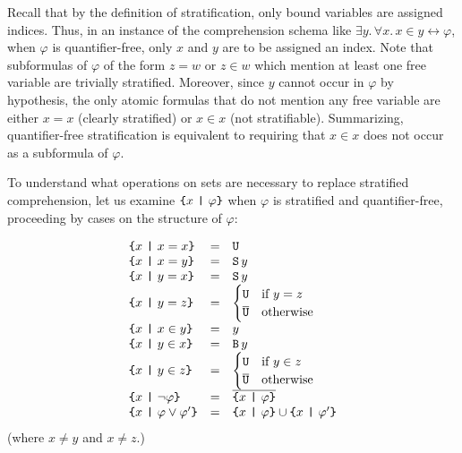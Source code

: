 \documentclass[sigplan,10pt,anonymous,review]{acmart}%
\begin{document}
Recall that by the definition of stratification, only bound variables are assigned indices. Thus, in an instance of the comprehension schema like $\exists y.\, \forall x.\, x \in y \leftrightarrow \varphi$, when $\varphi$ is quantifier-free, only $x$ and $y$ are to be assigned an index. Note that subformulas of $\varphi$ of the form $z = w$ or $z \in w$ which mention at least one free variable are trivially stratified. Moreover, since $y$ cannot occur in $\varphi$ by hypothesis, the only atomic formulas that do not mention any free variable are either $x=x$ (clearly stratified) or $x\in x$ (not stratifiable).
% 
Summarizing, quantifier-free stratification is equivalent to requiring that $x\in x$ does not occur as a subformula of $\varphi$.

\medskip

To understand what operations on sets are necessary to replace stratified comprehension, let us examine $\text{\texttt{\{}} x ~\text{\texttt{|}}~ \varphi \text{\texttt{\}}}$ when $\varphi$ is stratified and quantifier-free, proceeding by cases on the structure of $\varphi$:

\[\begin{array}{lcll}
  \text{\texttt{\{}} x ~\text{\texttt{|}}~ x = x \text{\texttt{\}}} & = & \text{\texttt{U}} \\
  \text{\texttt{\{}} x ~\text{\texttt{|}}~ x = y \text{\texttt{\}}} & = & \text{\texttt{S}}\,y \\
  \text{\texttt{\{}} x ~\text{\texttt{|}}~ y = x \text{\texttt{\}}} & = & \text{\texttt{S}}\,y \\
  \text{\texttt{\{}} x ~\text{\texttt{|}}~ y = z \text{\texttt{\}}} & = &
    \begin{cases}
      \text{\texttt{U}} & \text{if } y = z\\
      \overline{\text{\texttt{U}}} & \text{otherwise}
    \end{cases}\\
  \text{\texttt{\{}} x ~\text{\texttt{|}}~ x \in y \text{\texttt{\}}} & = & y \\
  \text{\texttt{\{}} x ~\text{\texttt{|}}~ y \in x \text{\texttt{\}}} & = & \text{\texttt{B}}\,y \\
  \text{\texttt{\{}} x ~\text{\texttt{|}}~ y \in z \text{\texttt{\}}} & = &
    \begin{cases}
      \text{\texttt{U}} & \text{if } y \in z\\
      \overline{\text{\texttt{U}}} & \text{otherwise}
    \end{cases}\\
  \text{\texttt{\{}} x ~\text{\texttt{|}}~ \neg\varphi \text{\texttt{\}}} & = & \overline{\text{\texttt{\{}} x ~\text{\texttt{|}}~ \varphi \text{\texttt{\}}}} \\
  \text{\texttt{\{}} x ~\text{\texttt{|}}~ \varphi \lor \varphi' \text{\texttt{\}}} & = & \text{\texttt{\{}} x ~\text{\texttt{|}}~ \varphi \text{\texttt{\}}} \cup \text{\texttt{\{}} x ~\text{\texttt{|}}~ \varphi' \text{\texttt{\}}} \\
\end{array}\]
(where $x\neq y$ and $x \neq z$.)

\medskip
\end{document}
